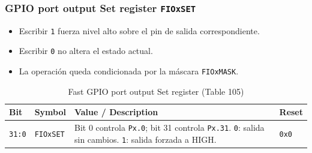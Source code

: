 \subsubsection{GPIO port output Set register \texttt{FIOxSET}}
\begin{itemize}
  \item Escribir \texttt{1} fuerza nivel alto sobre el pin de salida correspondiente.
  \item Escribir \texttt{0} no altera el estado actual.
  \item La operación queda condicionada por la máscara \texttt{FIOxMASK}.
\end{itemize}

\begin{table}[H]
  \centering
  \small
  \caption{Fast GPIO port output Set register (Table 105)}
  \begin{tabularx}{0.96\textwidth}{|>{\centering\arraybackslash}p{}|>{\raggedright\arraybackslash}p{}|>{\raggedright\arraybackslash}X|>{\centering\arraybackslash}p{}|}
    \hline
    \textbf{Bit} & \textbf{Symbol} & \textbf{Value / Description} & \textbf{Reset} \\
    \hline
    \texttt{31:0} & \texttt{FIOxSET} & Bit 0 controla \texttt{Px.0}; bit 31 controla \texttt{Px.31}. \texttt{0}: salida sin cambios. \texttt{1}: salida forzada a HIGH. & \texttt{0x0} \\
    \hline
  \end{tabularx}
\end{table}

